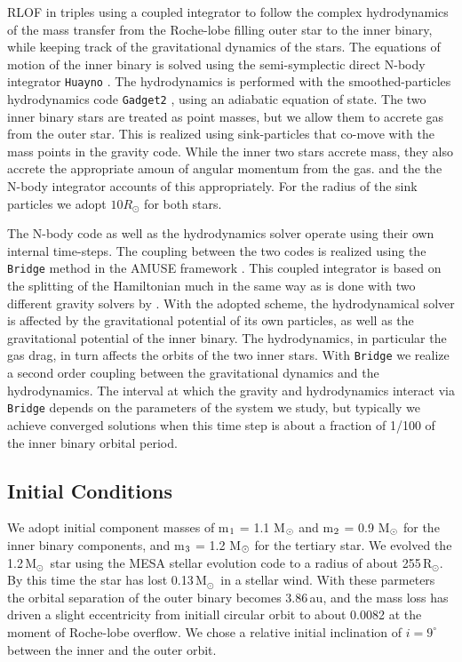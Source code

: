 \documentclass{aastex62}
\newcommand{\MSun}{\mbox{M$_\odot$}}
\newcommand{\RSun}{\mbox{R$_\odot$}}
\begin{document}
RLOF in triples using a coupled integrator to follow the complex
hydrodynamics of the mass transfer from the Roche-lobe filling outer
star to the inner binary, while keeping track of the gravitational
dynamics of the stars.  The equations of motion of the inner binary is
solved using the semi-symplectic direct N-body integrator
\texttt{Huayno} \citep{2012NewA...17..711P}. The hydrodynamics is
performed with the smoothed-particles hydrodynamics code
\texttt{Gadget2} \citep{2000ascl.soft03001S}, using an adiabatic
equation of state.  The two inner binary stars are treated as point
masses, but we allow them to accrete gas from the outer star.  This is
realized using sink-particles that co-move with the mass points in the
gravity code. While the inner two stars accrete mass, they also
accrete the appropriate amoun of angular momentum from the gas.  and
the the N-body integrator accounts of this appropriately.  For the
radius of the sink particles we adopt $10 R_\odot$ for both stars.

The N-body code as well as the hydrodynamics solver operate using
their own internal time-steps. The coupling between the two codes is
realized using the \texttt{Bridge} method in the AMUSE framework
\citep[see Sect.\.4.3.1 in][]{2013CoPhC.183..456P}.  This coupled
integrator is based on the splitting of the Hamiltonian much in the
same way as is done with two different gravity solvers by
\cite{2007PASJ...59.1095F}. With the adopted scheme, the
hydrodynamical solver is affected by the gravitational potential of
its own particles, as well as the gravitational potential of the inner
binary. The hydrodynamics, in particular the gas drag, in turn affects
the orbits of the two inner stars. With \texttt{Bridge} we realize a
second order coupling between the gravitational dynamics and the
hydrodynamics.  The interval at which the gravity and hydrodynamics
interact via \texttt{Bridge} depends on the parameters of the system
we study, but typically we achieve converged solutions when this time
step is about a fraction of 1/100 of the inner binary orbital period.

\subsection{Initial Conditions} \label{Sect:ICs}

We adopt initial component masses of m$_{\rm 1}$ = 1.1 M$_{\rm \odot}$
and m$_{\rm 2}$ = 0.9 M$_{\rm \odot}$ for the inner binary components,
and m$_{\rm 3}$ = 1.2 M$_{\rm \odot}$ for the tertiary star.  We
evolved the 1.2\,\MSun\, star using the MESA stellar evolution code
\cite{2011ApJS..192....3P} to a radius of about 255\,\RSun.  By this
time the star has lost 0.13\,\MSun\, in a stellar wind.  With these
parmeters the orbital separation of the outer binary becomes 3.86\,au,
and the mass loss has driven a slight eccentricity from initiall
circular orbit to about 0.0082 at the moment of Roche-lobe
overflow. We chose a relative initial inclination of $i = 9^\circ$
between the inner and the outer orbit.
\end{document}
